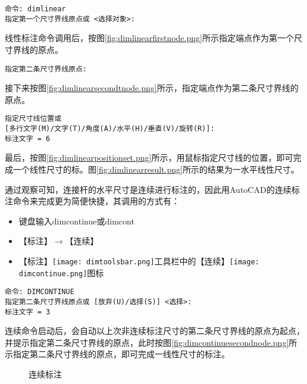 \begin{procedure}
\begin{lstlisting}
命令: dimlinear
指定第一个尺寸界线原点或 <选择对象>:
\end{lstlisting}

线性标注命令调用后，按图\ref{fig:dimlinearfirstnode.png}所示指定端点作为第一个尺寸界线的原点。
\begin{lstlisting}
指定第二条尺寸界线原点:
\end{lstlisting}
接下来按图\ref{fig:dimlinearsecondtnode.png}所示，指定端点作为第二条尺寸界线的原点。
\begin{lstlisting}
指定尺寸线位置或
[多行文字(M)/文字(T)/角度(A)/水平(H)/垂直(V)/旋转(R)]:
标注文字 = 6
\end{lstlisting}
最后，按图\ref{fig:dimlinearpositionset.png}所示，用鼠标指定尺寸线的位置，即可完成一个线性尺寸的标。图\ref{fig:dimlinearresult.png}所示的结果为一水平线性尺寸。

通过观察可知，连接杆的水平尺寸是连续进行标注的，因此用AutoCAD的连续标注命令来完成更为简便快捷，其调用的方式有：
\begin{itemize}
\item 键盘输入dimcontinue或dimcont
\item 【标注】$\rightarrow $【连续】
\item 【标注】\texttt{[image: dimtoolsbar.png]}工具栏中的【连续】\texttt{[image: dimcontinue.png]}图标
\end{itemize}
\begin{lstlisting}
命令: DIMCONTINUE
指定第二条尺寸界线原点或 [放弃(U)/选择(S)] <选择>:
标注文字 = 3
\end{lstlisting}
连续命令启动后，会自动以上次非连续标注尺寸的第二条尺寸界线的原点为起点，并提示指定第二条尺寸界线的原点，此时按图\ref{fig:dimcontinuesecondnode.png}所示指定第二条尺寸界线的原点，即可完成一线性尺寸的标注。

\begin{figure}[htbp]
\centering
{}\hspace{20pt}
\caption{连续标注}
\end{figure}


\end{procedure}
